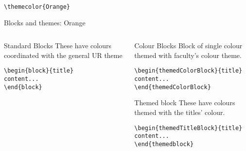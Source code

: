 \begingroup
{}
\begin{center}\verb|\themecolor{Orange}|\end{center}
\begin{frame}[fragile]{Blocks and themes: Orange}
\begin{columns} %
\begin{column}{0.3\textwidth}
\begin{block}{Standard Blocks}
These have colours coordinated with the general UR theme
\begin{verbatim}
\begin{block}{title}
content...
\end{block}
\end{verbatim}
\end{block}
\end{column}
\begin{column}{0.7\textwidth}
\begin{themedColorBlock}{Colour Blocks}
Block of single colour themed with faculty's colour theme.
\small
\begin{verbatim}
\begin{themedColorBlock}{title}
content...
\end{themedColorBlock}
\end{verbatim}
\end{themedColorBlock}
\begin{themedTitleBlock} {Themed block}
These have colours themed with the titles' colour.
\small
\begin{verbatim}
\begin{themedTitleBlock}{title}
content...
\end{themedblock}
\end{verbatim}
\end{themedTitleBlock}
\end{column}
\end{columns}
\end{frame}
\endgroup


